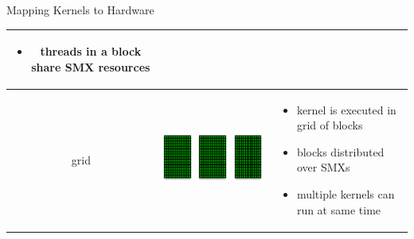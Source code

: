 \documentclass[aspectratio=43]{beamer}
\begin{document}
\begin{frame}[fragile]{Mapping Kernels to Hardware}
\begin{center}
\begin{tabular}{|c|m{4cm}|m{5cm}|}
\begin{itemize}
            \item threads in a block share SMX resources
        \end{itemize} \\
    \hline
        grid &
        \begin{minipage}{4cm}
            \includegraphics[width=0.3\textwidth]{./images/smx.pdf}
            \includegraphics[width=0.3\textwidth]{./images/smx.pdf}
            \includegraphics[width=0.3\textwidth]{./images/smx.pdf}
        \end{minipage} &
        \footnotesize
        \begin{itemize}
            \item kernel is executed in grid of blocks
            \item blocks distributed over SMXs
            \item multiple kernels can run at same time
        \end{itemize} \\
\hline
\end{tabular}
\end{center}
\end{frame}
\end{document}
